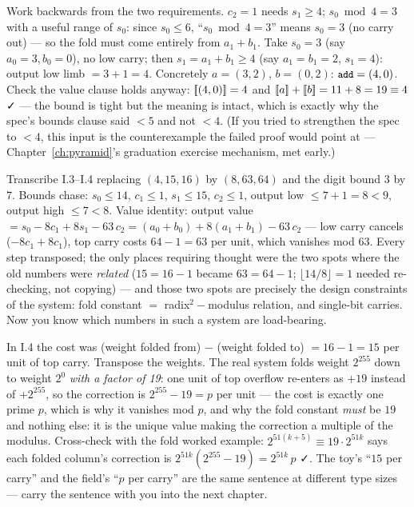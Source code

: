 \pathway Work backwards from the two requirements. $c_2 = 1$ needs
$s_1 \ge 4$; $s_0 \bmod 4 = 3$ with a useful range of $s_0$: since
$s_0 \le 6$, ``$s_0 \bmod 4 = 3$'' means $s_0 = 3$ (no carry out) --- so
the fold must come entirely from $a_1 + b_1$.
\answer Take $s_0 = 3$ (say $a_0 = 3, b_0 = 0$), no low carry; then
$s_1 = a_1 + b_1 \ge 4$ (say $a_1 = b_1 = 2$, $s_1 = 4$): output low
limb $= 3 + 1 = 4$. Concretely $a = (3,2)$, $b = (0,2)$:
$\code{add} = (4, 0)$. Check the value clause holds anyway:
$[\mkern-3.3mu[ (4,0) ]\mkern-3.3mu] = 4$ and $[\mkern-3.3mu[ a ]\mkern-3.3mu] + [\mkern-3.3mu[ b ]\mkern-3.3mu] = 11 + 8 = 19 \equiv 4$
✓ --- the bound is tight but the meaning is intact, which is exactly why
the spec's bounds clause said $< 5$ and not $< 4$. (If you tried to
strengthen the spec to $< 4$, this input is the counterexample the
failed proof would point at --- Chapter~\ref{ch:pyramid}'s graduation
exercise mechanism, met early.)

\pathway Transcribe I.3--I.4 replacing $(4, 15, 16)$ by $(8, 63, 64)$
and the digit bound $3$ by $7$.
\answer Bounds chase: $s_0 \le 14$, $c_1 \le 1$, $s_1 \le 15$,
$c_2 \le 1$, output low $\le 7 + 1 = 8 < 9$, output high $\le 7 < 8$.
Value identity: output value
$= s_0 - 8c_1 + 8s_1 - 63\,c_2
= (a_0 + b_0) + 8(a_1 + b_1) - 63\,c_2$ --- low carry cancels
($-8c_1 + 8c_1$), top carry costs $64 - 1 = 63$ per unit, which
vanishes mod $63$. Every step transposed; the only places requiring
thought were the two spots where the old numbers were \emph{related}
($15 = 16 - 1$ became $63 = 64 - 1$; $\lfloor 14/8 \rfloor = 1$ needed
re-checking, not copying) --- and those two spots are precisely the
design constraints of the system: fold constant $=$ radix$^2 - $modulus
relation, and single-bit carries. Now you know which numbers in such a
system are load-bearing.

\pathway In I.4 the cost was (weight folded from) $-$ (weight folded
to) $= 16 - 1 = 15$ per unit of top carry. Transpose the weights.
\answer The real system folds weight $2^{255}$ down to weight $2^{0}$
\emph{with a factor of 19}: one unit of top overflow re-enters as $+19$
instead of $+2^{255}$, so the correction is
$2^{255} - 19 = p$ per unit --- the cost is exactly one prime $p$, which
is why it vanishes mod $p$, and why the fold constant \emph{must} be
$19$ and nothing else: it is the unique value making the correction a
multiple of the modulus. Cross-check with the fold worked example:
$2^{51(k+5)} \equiv 19 \cdot 2^{51k}$ says each folded column's
correction is $2^{51k}(2^{255} - 19) = 2^{51k}\, p$ ✓. The toy's
``$15$ per carry'' and the field's ``$p$ per carry'' are the same
sentence at different type sizes --- carry the sentence with you into
the next chapter.

